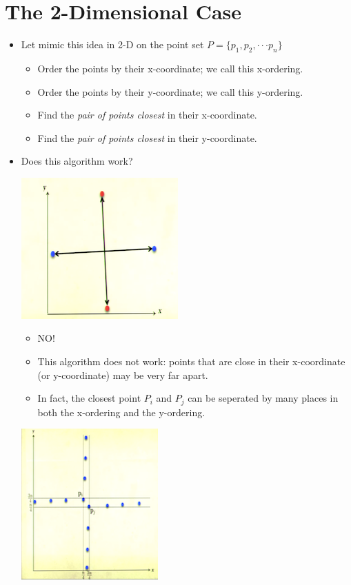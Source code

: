 \documentclass[12pt]{article}
\begin{document}
\section{The 2-Dimensional Case}
\renewcommand{\labelitemii}{$\circ$}
\renewcommand{\labelitemiii}{$\cdot$}
\renewcommand{\labelitemiii}{$\rightarrow$}
\renewcommand{\labelitemiv}{$\star$}
\begin{itemize}
\item Let mimic this idea in 2-D on the point set $P = \{p_1, p_2, \cdot \cdot \cdot p_n\}$
	\begin{itemize}
	\item Order the points by their x-coordinate; we call this x-ordering.
	\item Order the points by their y-coordinate; we call this y-ordering.
	\item Find the \textit{pair of points closest} in their x-coordinate.
	\item Find the \textit{pair of points closest} in their y-coordinate.
	\end{itemize}

\item Does this algorithm work?
\begin{center}
\includegraphics{lecture63}
\end{center}
	\begin{itemize}
	\item NO!
	\item This algorithm does not work: points that are close in their x-coordinate (or y-coordinate) may be very far apart.
	\item In fact, the closest point $P_i$ and $P_j$ can be seperated by many places in both the x-ordering and the y-ordering.
	\end{itemize}
\begin{center}
\includegraphics{lecture64}
\end{center}
\end{itemize}
	
\end{document}
